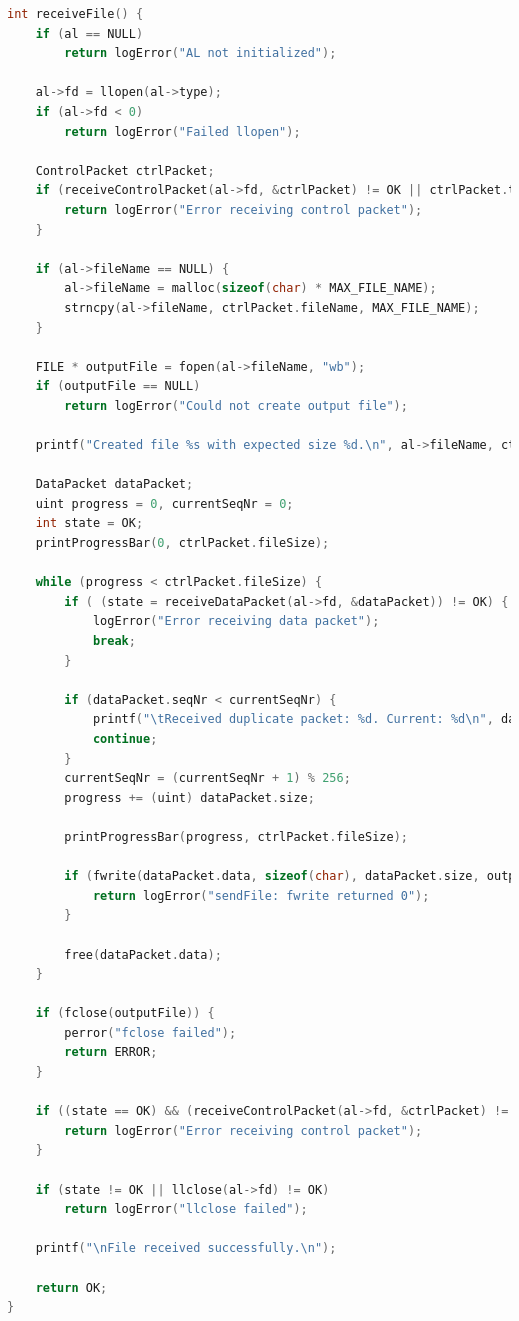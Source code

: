 \documentclass[a4paper, 11pt]{article}
\begin{document}
\begin{lstlisting}[caption = receiveFile, language=C]
int receiveFile() {
	if (al == NULL)
		return logError("AL not initialized");

	al->fd = llopen(al->type);
	if (al->fd < 0)
		return logError("Failed llopen");

	ControlPacket ctrlPacket;
	if (receiveControlPacket(al->fd, &ctrlPacket) != OK || ctrlPacket.type != START) {
		return logError("Error receiving control packet");
	}

	if (al->fileName == NULL) {
		al->fileName = malloc(sizeof(char) * MAX_FILE_NAME);
		strncpy(al->fileName, ctrlPacket.fileName, MAX_FILE_NAME);
	}

	FILE * outputFile = fopen(al->fileName, "wb");
	if (outputFile == NULL)
		return logError("Could not create output file");

	printf("Created file %s with expected size %d.\n", al->fileName, ctrlPacket.fileSize);

	DataPacket dataPacket;
	uint progress = 0, currentSeqNr = 0;
	int state = OK;
	printProgressBar(0, ctrlPacket.fileSize);

	while (progress < ctrlPacket.fileSize) {
		if ( (state = receiveDataPacket(al->fd, &dataPacket)) != OK) {
			logError("Error receiving data packet");
			break;
		}

		if (dataPacket.seqNr < currentSeqNr) {
			printf("\tReceived duplicate packet: %d. Current: %d\n", dataPacket.seqNr, currentSeqNr);
			continue;
		}
		currentSeqNr = (currentSeqNr + 1) % 256;
		progress += (uint) dataPacket.size;

		printProgressBar(progress, ctrlPacket.fileSize);

		if (fwrite(dataPacket.data, sizeof(char), dataPacket.size, outputFile) == 0) {
			return logError("sendFile: fwrite returned 0");
		}

		free(dataPacket.data);
	}

	if (fclose(outputFile)) {
		perror("fclose failed");
		return ERROR;
	}

	if ((state == OK) && (receiveControlPacket(al->fd, &ctrlPacket) != OK || ctrlPacket.type != END)) {
		return logError("Error receiving control packet");
	}

	if (state != OK || llclose(al->fd) != OK)
		return logError("llclose failed");

	printf("\nFile received successfully.\n");

	return OK;
}
\end{lstlisting}
\end{document}

